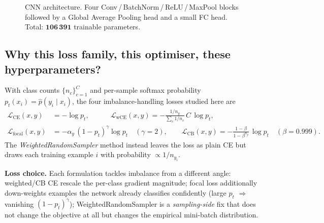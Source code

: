 \documentclass[11pt,a4paper]{article}
\theoremstyle{definition}
\begin{document}
\begin{figure}[H]
\centering
{}
\caption{CNN architecture. Four Conv\,/\,BatchNorm\,/\,ReLU\,/\,MaxPool blocks
followed by a Global Average Pooling head and a small FC head. Total:
$\mathbf{106\,391}$ trainable parameters.}
\label{fig:cnn}
\end{figure}

\subsection{Why this loss family, this optimiser, these hyperparameters?}

\begin{theorybox}
With class counts $\{n_c\}_{c=1}^{C}$ and per-sample softmax probability
$p_t(x_i)=\hat{p}(y_i\mid x_i)$, the four imbalance-handling losses studied
here are
\begin{align}
\mathcal{L}_{\text{CE}}(x,y)        &= -\log p_t,
\qquad\quad
\mathcal{L}_{\text{wCE}}(x,y)        = -\frac{1/n_y}{\sum_c 1/n_c}\,C\,\log p_t,\\[2pt]
\mathcal{L}_{\text{focal}}(x,y)      &= -\alpha_y\,(1-p_t)^{\gamma}\log p_t
        \quad(\gamma=2),\qquad
\mathcal{L}_{\text{CB}}(x,y)         = -\frac{1-\beta}{1-\beta^{n_y}}\,\log p_t
        \quad(\beta=0.999).
\end{align}
The \textit{WeightedRandomSampler} method instead leaves the loss as plain CE
but draws each training example $i$ with probability $\propto 1/n_{y_i}$.
\end{theorybox}

\textbf{Loss choice.} Each formulation tackles imbalance from a different
angle: weighted/CB CE rescale the per-class gradient magnitude; focal loss
\cite{lin2017focal} additionally down-weights examples the network already
classifies confidently (large $p_t$ $\Rightarrow$ vanishing $(1-p_t)^\gamma$);
WeightedRandomSampler is a \emph{sampling-side} fix that does not change the
objective at all but changes the empirical mini-batch distribution.
\end{document}
